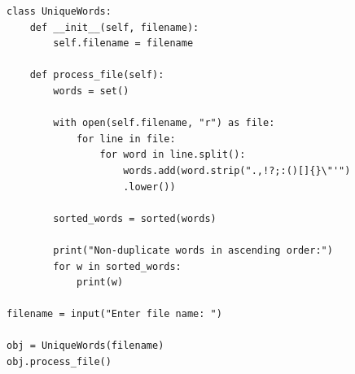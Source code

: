 \begin{verbatim}
class UniqueWords:
    def __init__(self, filename):
        self.filename = filename

    def process_file(self):
        words = set()

        with open(self.filename, "r") as file:
            for line in file:
                for word in line.split():
                    words.add(word.strip(".,!?;:()[]{}\"'")
                    .lower())

        sorted_words = sorted(words)

        print("Non-duplicate words in ascending order:")
        for w in sorted_words:
            print(w)

filename = input("Enter file name: ")

obj = UniqueWords(filename)
obj.process_file()
\end{verbatim}